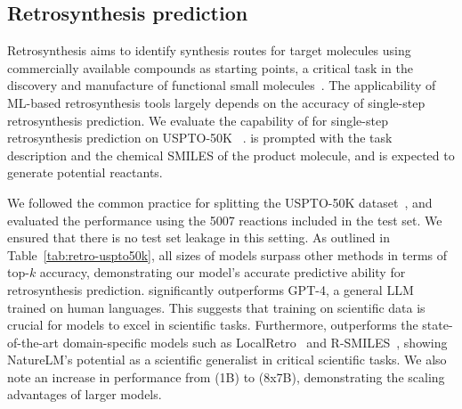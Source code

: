 \begin{table}[!htpb]
\centering
{}
\caption{Optimization results of BBBP metabolism and CYP enzymes. Measured by success rate. }
\label{tab:cyp_optimization}
\end{table}


\subsection{Retrosynthesis prediction}\label{sec:retro}
Retrosynthesis aims to identify synthesis routes for target molecules using commercially available compounds  as starting points, a critical task in the discovery and manufacture of functional small molecules~\cite{corey1969computer, segler2018planning, maziarz2024chimera}.
The applicability of ML-based retrosynthesis tools largely depends on the accuracy of single-step retrosynthesis prediction.
We evaluate the capability of \ourM{} for single-step retrosynthesis prediction on USPTO-50K ~\cite{schneider2016uspto50k}.
\ourM{} is prompted with the task description and the chemical SMILES of the product molecule, and is expected to generate potential reactants. 

We followed the common practice for splitting the USPTO-50K dataset~\cite{dai2019retrosynthesis, maziarz2024re}, and evaluated the performance using the 5007 reactions included in the test set.
We ensured that there is no test set leakage in this setting.
As outlined in Table~\ref{tab:retro-uspto50k},
all sizes of \ourM{} models surpass other methods in terms of top-$k$ accuracy, demonstrating our
model’s accurate predictive ability for retrosynthesis prediction.
\ourM{} significantly outperforms GPT-4, a general LLM trained on human languages. 
This suggests that training on scientific data is crucial for models to excel in scientific tasks. 
Furthermore, \ourM{} outperforms the state-of-the-art domain-specific models such as LocalRetro~\cite{chen2021localretro} and R-SMILES~\cite{Zhong2022rsmiles}, showing NatureLM’s potential as a scientific generalist in critical scientific tasks. We also note an increase in performance from \ourM{} (1B) to \ourM{} (8x7B), demonstrating the scaling advantages of larger models.

